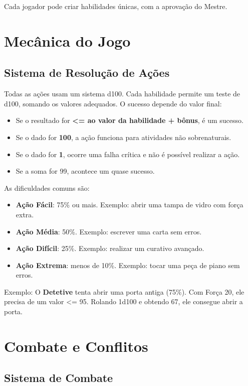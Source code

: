 \documentclass[a4paper,12pt]{book}
\begin{document}
Cada jogador pode criar habilidades únicas, com a aprovação do Mestre.

\chapter{Mecânica do Jogo}

\section{Sistema de Resolução de Ações}

Todas as ações usam um sistema d100. Cada habilidade permite um teste de d100, somando os valores adequados. O sucesso depende do valor final:
\begin{itemize}
    \item Se o resultado for \textbf{<= ao valor da habilidade + bônus}, é um sucesso.
    \item Se o dado for \textbf{100}, a ação funciona para atividades não sobrenaturais.
    \item Se o dado for \textbf{1}, ocorre uma falha crítica e não é possível realizar a ação.
    \item Se a soma for 99, acontece um quase sucesso.
\end{itemize}

As dificuldades comuns são:
\begin{itemize}
    \item \textbf{Ação Fácil}: 75\% ou mais. Exemplo: abrir uma tampa de vidro com força extra.
    \item \textbf{Ação Média}: 50\%. Exemplo: escrever uma carta sem erros.
    \item \textbf{Ação Difícil}: 25\%. Exemplo: realizar um curativo avançado.
    \item \textbf{Ação Extrema}: menos de 10\%. Exemplo: tocar uma peça de piano sem erros.
\end{itemize}

Exemplo: O \textbf{Detetive} tenta abrir uma porta antiga (75\%). Com Força 20, ele precisa de um valor <= 95. Rolando 1d100 e obtendo 67, ele consegue abrir a porta.

\chapter{Combate e Conflitos}

\section{Sistema de Combate}
\end{document}
